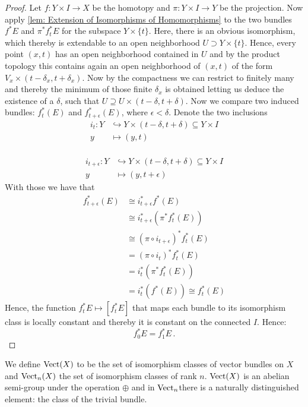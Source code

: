 \begin{proof}
	Let $f:Y\times I\to X$ be the homotopy and $\pi:Y\times I \to Y$ be the projection. Now apply \ref{lem: Extension of Isomorphisms of Homomorphisms} to the two bundles $f^*E$ and $\pi^*f_t^*E$ for the subspace $Y \times \{t\}$. Here, there is an obvious isomorphism, which thereby is extendable to an open neighborhood $U\supset Y\times \{t\}$.
	Hence, every point $(x,t)$ has an open neighborhood contained in $U$ and by the product topology this contains again an open neighborhood of $(x,t)$ of the form $V_x\times (t-\delta_x,t+\delta_x)$. Now by the compactness we can restrict to finitely many and thereby the minimum of those finite $\delta_x$ is obtained letting us deduce the existence of a $\delta$, such that $U\supseteq U\times (t-\delta,t+\delta)$.
	Now we compare two induced bundles: $f_t^*(E)$ and $f_{t+\epsilon}^*(E)$, where $\epsilon <\delta$. Denote the two inclusions 
	\begin{align*}
		i_t:Y&\hookrightarrow Y\times (t-\delta,t+\delta)\subseteq Y\times I \\
		y    &\mapsto (y,t)\\
	\end{align*}
	
	\begin{align}
		i_{t+\epsilon}:Y&\hookrightarrow Y\times (t-\delta,t+\delta)\subseteq Y\times I \\
		y    &\mapsto (y,t+\epsilon)
	\end{align}
	With those we have that
	\begin{align*}
		f_{t+\epsilon}^*(E)&\cong i_{t+\epsilon}^*f^*(E)\\
		&\cong i_{t+\epsilon}^*(\pi^*f_t^*(E)) \\
		&\cong (\pi\circ i_{t+\epsilon})^*f_t^*(E)\\
		&= (\pi\circ i_t)^*f_t^*(E)\\
		&= i_t^*(\pi^*f_t^*(E))\\
		&=i_t^*(f^*(E))\cong f_t^*(E)
	\end{align*}
	Hence, the function $f^*_tE \mapsto [f^*_t E]$ that maps each bundle to its isomorphism class is locally constant and thereby it is constant on the connected $I$. Hence:
	\begin{equation*}
		f^*_0E=f^*_1E\, .
	\end{equation*}
\end{proof}
\begin{definition}\label{def: The Set of Isomorphism Classes}
	We define $\operatorname{\mathrm{Vect}}(X)$ to be the set of isomorphism classes of vector bundles on $X$ and $\operatorname{\mathrm{Vect}}_n(X)$ the set of isomorphism classes of rank $n$. $\operatorname{\mathrm{Vect}}(X)$ is an abelian semi-group under the operation $\oplus$ and in $\operatorname{\mathrm{Vect}}_n $there is a naturally distinguished element: the class of the trivial bundle.
\end{definition}
